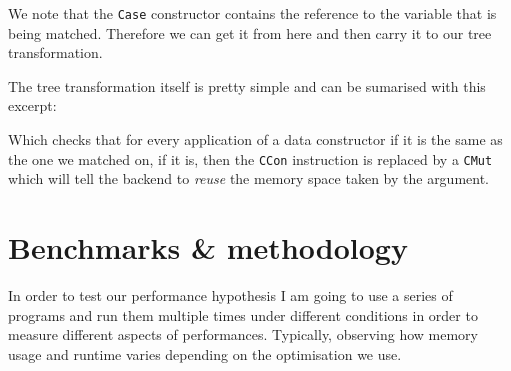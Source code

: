 \documentclass[
]{article}
\newenvironment{Shaded}{}{}
\newcommand{\DataTypeTok}[1]{\textcolor[rgb]{0.56,0.13,0.00}{#1}}
\newcommand{\FunctionTok}[1]{\textcolor[rgb]{0.02,0.16,0.49}{#1}}
\newcommand{\KeywordTok}[1]{\textcolor[rgb]{0.00,0.44,0.13}{\textbf{#1}}}
\newcommand{\NormalTok}[1]{#1}
\newcommand{\OperatorTok}[1]{\textcolor[rgb]{0.40,0.40,0.40}{#1}}
\newcommand{\OtherTok}[1]{\textcolor[rgb]{0.00,0.44,0.13}{#1}}
\begin{document}
We note that the \texttt{Case} constructor contains the reference to the
variable that is being matched. Therefore we can get it from here and
then carry it to our tree transformation.

The tree transformation itself is pretty simple and can be sumarised
with this excerpt:

\begin{Shaded}
\end{Shaded}

Which checks that for every application of a data constructor if it is
the same as the one we matched on, if it is, then the \texttt{CCon}
instruction is replaced by a \texttt{CMut} which will tell the backend
to \emph{reuse} the memory space taken by the argument.

\hypertarget{benchmarks-methodology}{%
\section{Benchmarks \& methodology}\label{benchmarks-methodology}}

In order to test our performance hypothesis I am going to use a series
of programs and run them multiple times under different conditions in
order to measure different aspects of performances. Typically, observing
how memory usage and runtime varies depending on the optimisation we
use.
\end{document}
